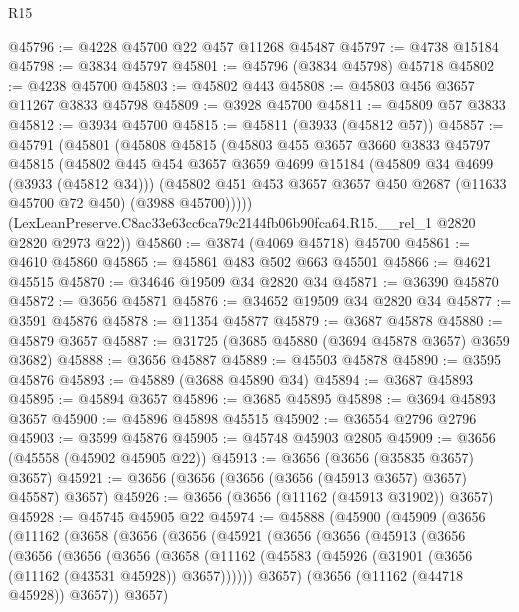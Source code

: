 \begin{lexlean}{R15}
\begin{coremodule}
@45796 := @4228 @45700 @22 @457 @11268 @45487
@45797 := @4738 @15184
@45798 := @3834 @45797
@45801 := @45796 (@3834 @45798) @45718
@45802 := @4238 @45700
@45803 := @45802 @443
@45808 := @45803 @456 @3657 @11267 @3833 @45798
@45809 := @3928 @45700
@45811 := @45809 @57 @3833
@45812 := @3934 @45700
@45815 := @45811 (@3933 (@45812 @57))
@45857 := @45791
    (@45801
      (@45808
        @45815
        (@45803
          @455
          @3657
          @3660
          @3833
          @45797
          @45815
          (@45802
            @445
            @454
            @3657
            @3659
            @4699
            @15184
            (@45809 @34 @4699 (@3933 (@45812 @34)))
            (@45802 @451 @453 @3657 @3657 @450 @2687 (@11633 @45700 @72 @450) (@3988 @45700)))))
      (LexLeanPreserve.C8ac33e63cc6ca79c2144fb06b90fca64.R15.__rel_1 @2820 @2820 @2973 @22))
@45860 := @3874 (@4069 @45718) @45700
@45861 := @4610 @45860
@45865 := @45861 @483 @502 @663 @45501
@45866 := @4621 @45515
@45870 := @34646 @19509 @34 @2820 @34
@45871 := @36390 @45870
@45872 := @3656 @45871
@45876 := @34652 @19509 @34 @2820 @34
@45877 := @3591 @45876
@45878 := @11354 @45877
@45879 := @3687 @45878
@45880 := @45879 @3657
@45887 := @31725 (@3685 @45880 (@3694 @45878 @3657) @3659 @3682)
@45888 := @3656 @45887
@45889 := @45503 @45878
@45890 := @3595 @45876
@45893 := @45889 (@3688 @45890 @34)
@45894 := @3687 @45893
@45895 := @45894 @3657
@45896 := @3685 @45895
@45898 := @3694 @45893 @3657
@45900 := @45896 @45898 @45515
@45902 := @36554 @2796 @2796
@45903 := @3599 @45876
@45905 := @45748 @45903 @2805
@45909 := @3656 (@45558 (@45902 @45905 @22))
@45913 := @3656 (@3656 (@35835 @3657) @3657)
@45921 := @3656 (@3656 (@3656 (@3656 (@45913 @3657) @3657) @45587) @3657)
@45926 := @3656 (@3656 (@11162 (@45913 @31902)) @3657)
@45928 := @45745 @45905 @22
@45974 := @45888
    (@45900
      (@45909
        (@3656
          (@11162
            (@3658
              (@3656
                (@3656
                  (@45921
                    (@3656
                      (@3656
                        (@45913
                          (@3656
                            (@3656
                              (@3656
                                (@3656
                                  (@3658
                                    (@11162
                                      (@45583
                                        (@45926 (@31901 (@3656 (@11162 (@43531 @45928)) @3657))))))
                                  @3657)
                                (@3656 (@11162 (@44718 @45928)) @3657))
                              @3657)

\end{coremodule}
\end{lexlean}
